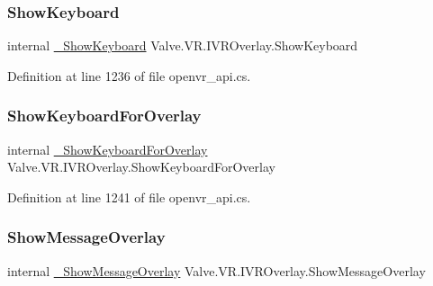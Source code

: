 \mbox{\label{struct_valve_1_1_v_r_1_1_i_v_r_overlay_a3433ac58417758118728876bed2eda67}} 
\subsubsection{\texorpdfstring{ShowKeyboard}{ShowKeyboard}}
{\footnotesize\ttfamily internal \mbox{\hyperlink{struct_valve_1_1_v_r_1_1_i_v_r_overlay_a3f0da6da79c2932b9619f74f119f24f5}{\+\_\+\+Show\+Keyboard}} Valve.\+V\+R.\+I\+V\+R\+Overlay.\+Show\+Keyboard}



Definition at line 1236 of file openvr\+\_\+api.\+cs.

\mbox{\label{struct_valve_1_1_v_r_1_1_i_v_r_overlay_a1af4052892eb3240f5c314271a2886d1}} 
\subsubsection{\texorpdfstring{ShowKeyboardForOverlay}{ShowKeyboardForOverlay}}
{\footnotesize\ttfamily internal \mbox{\hyperlink{struct_valve_1_1_v_r_1_1_i_v_r_overlay_ad13a58d49b69b35ac76962579290372f}{\+\_\+\+Show\+Keyboard\+For\+Overlay}} Valve.\+V\+R.\+I\+V\+R\+Overlay.\+Show\+Keyboard\+For\+Overlay}



Definition at line 1241 of file openvr\+\_\+api.\+cs.

\mbox{\label{struct_valve_1_1_v_r_1_1_i_v_r_overlay_ad1ba80d569cd8ec1a5687e275909b1f4}} 
\subsubsection{\texorpdfstring{ShowMessageOverlay}{ShowMessageOverlay}}
{\footnotesize\ttfamily internal \mbox{\hyperlink{struct_valve_1_1_v_r_1_1_i_v_r_overlay_afadb2a0056062a8d7e051a7d961f782e}{\+\_\+\+Show\+Message\+Overlay}} Valve.\+V\+R.\+I\+V\+R\+Overlay.\+Show\+Message\+Overlay}



